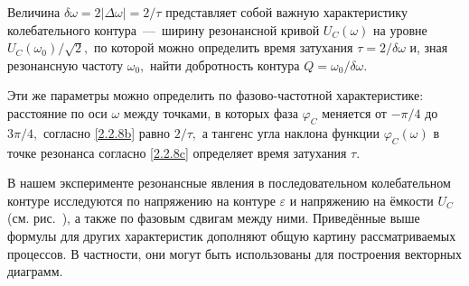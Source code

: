 Величина $\delta\omega=2|\Delta\omega|=2/\tau$ представляет собой важную характеристику колебательного контура~---~ширину резонансной кривой $U_C(\omega)$ на уровне $U_C(\omega_0)/\sqrt{2},$ по которой можно определить время затухания $\tau=2/\delta\omega$ и, зная резонансную частоту $\omega_0,$ найти добротность контура $Q=\omega_0/\delta\omega.$

Эти же параметры можно определить по фазово-частотной характеристике: расстояние по оси $\omega$ между точками, в которых фаза $\varphi_C$ меняется от $-\pi/4$ до $3\pi/4,$ согласно \eqref{2.2.8b} равно $2/\tau,$ а тангенс угла наклона функции $\varphi_C(\omega)$ в точке резонанса согласно \eqref{2.2.8c} определяет время затухания $\tau.$

В нашем эксперименте резонансные явления в последовательном колебательном контуре исследуются по напряжению на контуре $\varepsilon$ и напряжению на ёмкости $U_C$ (см. рис.~), а также по фазовым сдвигам между ними. Приведённые выше формулы для других характеристик дополняют общую картину рассматриваемых процессов. В частности, они могут быть использованы для построения векторных диаграмм.

